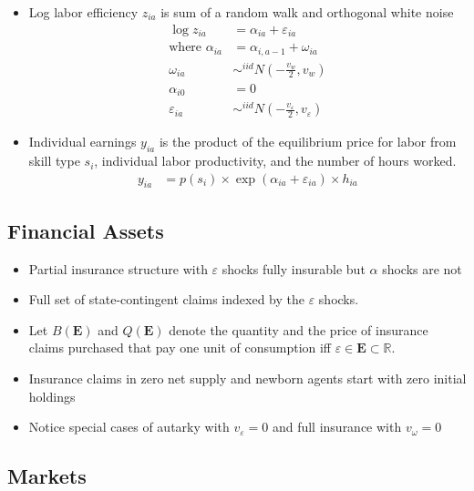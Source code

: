 \documentclass{article}
\newcommand{\R}{\mathbb{R}}
\newcommand{\Ebf}{\mathbf{E}}
\begin{document}
\begin{itemize}
\item Log labor efficiency $z_{ia}$ is sum of a random walk and orthogonal white noise
\begin{align}
\log z_{ia} &= \alpha_{ia} + \varepsilon_{ia} \\
\text{where }
\alpha_{ia} &= \alpha_{i, a - 1} + \omega_{ia} \nonumber\\
\omega_{ia} &\sim^{iid} N(-\frac{v_w}{2}, v_w) \nonumber \\
\alpha_{i0} &= 0 \nonumber\\
\varepsilon_{ia} &\sim^{iid} N(-\frac{v_\varepsilon}{2}, v_\varepsilon) \nonumber
\end{align}
\item Individual earnings $y_{ia}$ is the product of the equilibrium price for labor from skill type $s_i$, individual labor productivity, and the number of hours worked.
\begin{align}
y_{ia} &= p(s_i) \times \exp( \alpha_{ia} + \varepsilon_{ia}) \times h_{ia}
\end{align}
\end{itemize}



\subsection{Financial Assets}



\begin{itemize}
\item Partial insurance structure with $\varepsilon$ shocks fully insurable but $\alpha$ shocks are not
\item Full set of state-contingent claims indexed by the $\varepsilon$ shocks.
\item Let $B(\Ebf)$ and $Q(\Ebf)$ denote the quantity and the price of insurance claims purchased that pay one unit of consumption iff $\varepsilon \in \Ebf \subset \R$.
\item Insurance claims in zero net supply and newborn agents start with zero initial holdings
\item Notice special cases of autarky with $v_\varepsilon = 0$ and full insurance with $v_\omega = 0$
\end{itemize}



\subsection{Markets}
\end{document}
